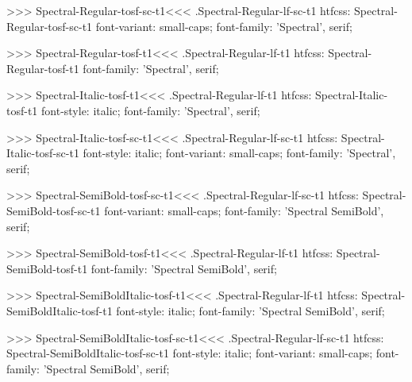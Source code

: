 >>>
\<Spectral-Regular-tosf-sc-t1\><<<
.Spectral-Regular-lf-sc-t1
htfcss:  Spectral-Regular-tosf-sc-t1  font-variant: small-caps; font-family: 'Spectral', serif;

>>>
\<Spectral-Regular-tosf-t1\><<<
.Spectral-Regular-lf-t1
htfcss:  Spectral-Regular-tosf-t1  font-family: 'Spectral', serif;

>>>
\<Spectral-Italic-tosf-t1\><<<
.Spectral-Regular-lf-t1
htfcss:  Spectral-Italic-tosf-t1  font-style: italic; font-family: 'Spectral', serif;

>>>
\<Spectral-Italic-tosf-sc-t1\><<<
.Spectral-Regular-lf-sc-t1
htfcss:  Spectral-Italic-tosf-sc-t1  font-style: italic; font-variant: small-caps; font-family: 'Spectral', serif;

>>>
\<Spectral-SemiBold-tosf-sc-t1\><<<
.Spectral-Regular-lf-sc-t1
htfcss:  Spectral-SemiBold-tosf-sc-t1  font-variant: small-caps; font-family: 'Spectral SemiBold', serif;

>>>
\<Spectral-SemiBold-tosf-t1\><<<
.Spectral-Regular-lf-t1
htfcss:  Spectral-SemiBold-tosf-t1  font-family: 'Spectral SemiBold', serif;

>>>
\<Spectral-SemiBoldItalic-tosf-t1\><<<
.Spectral-Regular-lf-t1
htfcss:  Spectral-SemiBoldItalic-tosf-t1  font-style: italic; font-family: 'Spectral SemiBold', serif;

>>>
\<Spectral-SemiBoldItalic-tosf-sc-t1\><<<
.Spectral-Regular-lf-sc-t1
htfcss:  Spectral-SemiBoldItalic-tosf-sc-t1  font-style: italic; font-variant: small-caps; font-family: 'Spectral SemiBold', serif;

